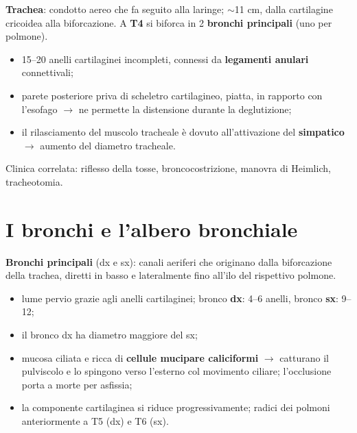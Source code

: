 \textbf{Trachea}: condotto aereo che fa seguito alla laringe; $\sim$11 cm, dalla cartilagine
cricoidea alla biforcazione. A \textbf{T4} si biforca in 2 \textbf{bronchi principali} (uno per
polmone).
\begin{itemize}
  \item 15--20 anelli cartilaginei incompleti, connessi da \textbf{legamenti anulari} connettivali;
  \item parete posteriore priva di scheletro cartilagineo, piatta, in rapporto con l'esofago
    $\rightarrow$ ne permette la distensione durante la deglutizione;
  \item il rilasciamento del muscolo tracheale è dovuto all'attivazione del \textbf{simpatico}
    $\rightarrow$ aumento del diametro tracheale.
\end{itemize}
Clinica correlata: riflesso della tosse, broncocostrizione, manovra di Heimlich, tracheotomia.

\section{I bronchi e l'albero bronchiale}

\textbf{Bronchi principali} (dx e sx): canali aeriferi che originano dalla biforcazione della
trachea, diretti in basso e lateralmente fino all'ilo del rispettivo polmone.
\begin{itemize}
  \item lume pervio grazie agli anelli cartilaginei; bronco \textbf{dx}: 4--6 anelli, bronco
    \textbf{sx}: 9--12;
  \item il bronco dx ha diametro maggiore del sx;
  \item mucosa ciliata e ricca di \textbf{cellule mucipare caliciformi} $\rightarrow$ catturano il
    pulviscolo e lo spingono verso l'esterno col movimento ciliare; l'occlusione porta a morte per
    asfissia;
  \item la componente cartilaginea si riduce progressivamente; radici dei polmoni anteriormente a
    T5 (dx) e T6 (sx).
\end{itemize}

